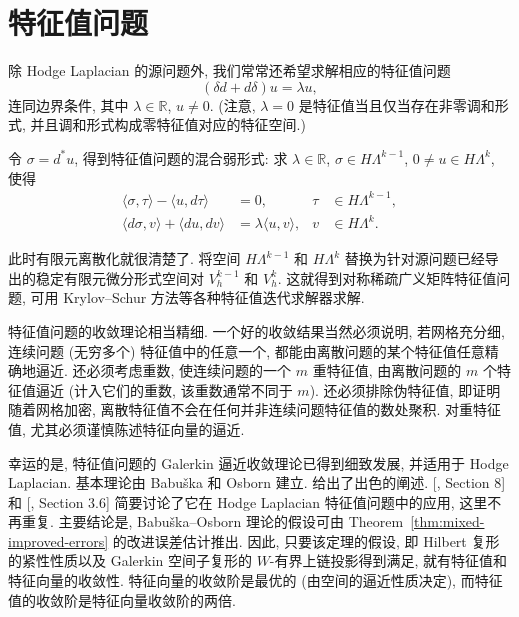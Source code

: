 \section{{特征值问题}}\label{sec:eigenvalue-problems}

{除 Hodge Laplacian 的源问题外, 我们常常还希望求解相应的特征值问题}
\[
(\delta d+d\delta)u=\lambda u,
\]
{连同边界条件, 其中 $\lambda\in\mathbb R$, $u\neq0$. (注意, $\lambda=0$ 是特征值当且仅当存在非零调和形式, 并且调和形式构成零特征值对应的特征空间.)}

{令 $\sigma=d^*u$, 得到特征值问题的混合弱形式: 求 $\lambda\in\mathbb R$, $\sigma\in H\Lambda^{k-1}$, $0\neq u\in H\Lambda^k$, 使得}
\[
\begin{aligned}
\langle\sigma,\tau\rangle-\langle u,d\tau\rangle&=0,&\tau&\in H\Lambda^{k-1},\\
\langle d\sigma,v\rangle+\langle du,dv\rangle&=\lambda\langle u,v\rangle,&v&\in H\Lambda^k.
\end{aligned}
\]

{此时有限元离散化就很清楚了. 将空间 $H\Lambda^{k-1}$ 和 $H\Lambda^k$ 替换为针对源问题已经导出的稳定有限元微分形式空间对 $V_h^{k-1}$ 和 $V_h^k$. 这就得到对称稀疏广义矩阵特征值问题, 可用 Krylov–Schur 方法等各种特征值迭代求解器求解.}

{特征值问题的收敛理论相当精细. 一个好的收敛结果当然必须说明, 若网格充分细, 连续问题 (无穷多个) 特征值中的任意一个, 都能由离散问题的某个特征值任意精确地逼近. 还必须考虑重数, 使连续问题的一个 $m$ 重特征值, 由离散问题的 $m$ 个特征值逼近 (计入它们的重数, 该重数通常不同于 $m$). 还必须排除伪特征值, 即证明随着网格加密, 离散特征值不会在任何并非连续问题特征值的数处聚积. 对重特征值, 尤其必须谨慎陈述特征向量的逼近.}

{幸运的是, 特征值问题的 Galerkin 逼近收敛理论已得到细致发展, 并适用于 Hodge Laplacian. 基本理论由 Babuška 和 Osborn  建立.  给出了出色的阐述. [, Section 8] 和 [, Section 3.6] 简要讨论了它在 Hodge Laplacian 特征值问题中的应用, 这里不再重复. 主要结论是, Babuška–Osborn 理论的假设可由 Theorem~\ref{thm:mixed-improved-errors} 的改进误差估计推出. 因此, 只要该定理的假设, 即 Hilbert 复形的紧性性质以及 Galerkin 空间子复形的 $W$-有界上链投影得到满足, 就有特征值和特征向量的收敛性. 特征向量的收敛阶是最优的 (由空间的逼近性质决定), 而特征值的收敛阶是特征向量收敛阶的两倍.}

